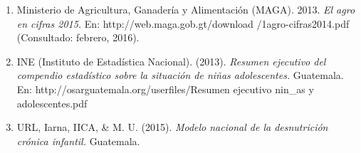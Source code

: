 \begin{enumerate}
	\item {Ministerio de Agricultura, Ganadería y Alimentación (MAGA). 2013. \textit{El agro en cifras 2015.} En: {http://web.maga.gob.gt/download /1agro-cifras2014.pdf}  (Consultado: febrero, 2016).}
	
	\item {INE (Instituto de Estadística Nacional). (2013). \textit{Resumen ejecutivo del compendio estadístico sobre la situación de niñas adolescentes.} Guatemala. En: {http://osarguatemala.org/userfiles/Resumen ejecutivo nin\_as y adolescentes.pdf}	}
	
	\item {URL, Iarna, IICA, \& M. U. (2015). \textit{Modelo nacional de la desnutrición crónica infantil.} Guatemala.}
\end{enumerate} 
$\ $\\

